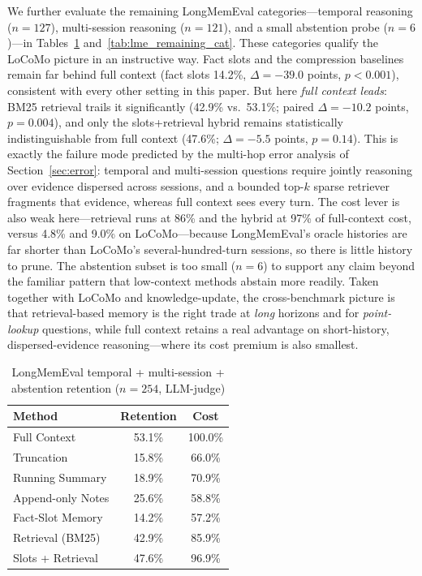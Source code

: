 \documentclass[conference]{IEEEtran}
\begin{document}
We further evaluate the remaining LongMemEval categories---temporal reasoning ($n=127$), multi-session reasoning ($n=121$), and a small abstention probe ($n=6$)---in Tables~\ref{tab:lme_remaining} and~\ref{tab:lme_remaining_cat}. These categories qualify the LoCoMo picture in an instructive way. Fact slots and the compression baselines remain far behind full context (fact slots 14.2\%, $\Delta=-39.0$ points, $p<0.001$), consistent with every other setting in this paper. But here \emph{full context leads}: BM25 retrieval trails it significantly (42.9\% vs.\ 53.1\%; paired $\Delta=-10.2$ points, $p=0.004$), and only the slots+retrieval hybrid remains statistically indistinguishable from full context (47.6\%; $\Delta=-5.5$ points, $p=0.14$). This is exactly the failure mode predicted by the multi-hop error analysis of Section~\ref{sec:error}: temporal and multi-session questions require jointly reasoning over evidence dispersed across sessions, and a bounded top-$k$ sparse retriever fragments that evidence, whereas full context sees every turn. The cost lever is also weak here---retrieval runs at 86\% and the hybrid at 97\% of full-context cost, versus 4.8\% and 9.0\% on LoCoMo---because LongMemEval's oracle histories are far shorter than LoCoMo's several-hundred-turn sessions, so there is little history to prune. The abstention subset is too small ($n=6$) to support any claim beyond the familiar pattern that low-context methods abstain more readily. Taken together with LoCoMo and knowledge-update, the cross-benchmark picture is that retrieval-based memory is the right trade at \emph{long} horizons and for \emph{point-lookup} questions, while full context retains a real advantage on short-history, dispersed-evidence reasoning---where its cost premium is also smallest.

\begin{table}[h]
\centering
\caption{LongMemEval temporal + multi-session + abstention retention ($n=254$, LLM-judge)}
\label{tab:lme_remaining}
\small
\setlength{\tabcolsep}{4pt}
\begin{tabular}{lcc}
\toprule
\textbf{Method} & \textbf{Retention} & \textbf{Cost} \\
\midrule
Full Context & 53.1\% & 100.0\% \\
Truncation & 15.8\% & 66.0\% \\
Running Summary & 18.9\% & 70.9\% \\
Append-only Notes & 25.6\% & 58.8\% \\
Fact-Slot Memory & 14.2\% & 57.2\% \\
Retrieval (BM25) & 42.9\% & 85.9\% \\
Slots + Retrieval & 47.6\% & 96.9\% \\
\bottomrule
\end{tabular}
\end{table}
\end{document}
